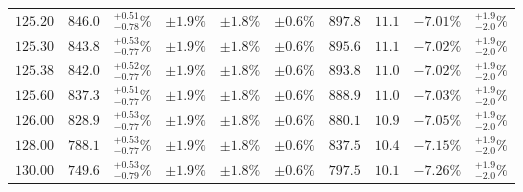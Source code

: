 \begin{table}[ht!]
{{\begin{tabular}{| cc | c | ccc | ccc | c |}
$125.20$ & $846.0$ & $^{+0.51}_{-0.78}\%$ & $\pm 1.9\%$ & {\color{black!55}$\pm 1.8\%$} & {\color{black!55}$\pm 0.6\%$} & $897.8$ & $11.1$ & $-7.01\%$ & $^{+1.9}_{-2.0}\%$ \\
$125.30$ & $843.8$ & $^{+0.53}_{-0.77}\%$ & $\pm 1.9\%$ & {\color{black!55}$\pm 1.8\%$} & {\color{black!55}$\pm 0.6\%$} & $895.6$ & $11.1$ & $-7.02\%$ & $^{+1.9}_{-2.0}\%$ \\
$125.38$ & $842.0$ & $^{+0.52}_{-0.77}\%$ & $\pm 1.9\%$ & {\color{black!55}$\pm 1.8\%$} & {\color{black!55}$\pm 0.6\%$} & $893.8$ & $11.0$ & $-7.02\%$ & $^{+1.9}_{-2.0}\%$ \\
$125.60$ & $837.3$ & $^{+0.51}_{-0.77}\%$ & $\pm 1.9\%$ & {\color{black!55}$\pm 1.8\%$} & {\color{black!55}$\pm 0.6\%$} & $888.9$ & $11.0$ & $-7.03\%$ & $^{+1.9}_{-2.0}\%$ \\
$126.00$ & $828.9$ & $^{+0.53}_{-0.77}\%$ & $\pm 1.9\%$ & {\color{black!55}$\pm 1.8\%$} & {\color{black!55}$\pm 0.6\%$} & $880.1$ & $10.9$ & $-7.05\%$ & $^{+1.9}_{-2.0}\%$ \\
$128.00$ & $788.1$ & $^{+0.53}_{-0.77}\%$ & $\pm 1.9\%$ & {\color{black!55}$\pm 1.8\%$} & {\color{black!55}$\pm 0.6\%$} & $837.5$ & $10.4$ & $-7.15\%$ & $^{+1.9}_{-2.0}\%$ \\
$130.00$ & $749.6$ & $^{+0.53}_{-0.79}\%$ & $\pm 1.9\%$ & {\color{black!55}$\pm 1.8\%$} & {\color{black!55}$\pm 0.6\%$} & $797.5$ & $10.1$ & $-7.26\%$ & $^{+1.9}_{-2.0}\%$ \\
\cline{1-10}
\end{tabular}
}
}
\end{table}

